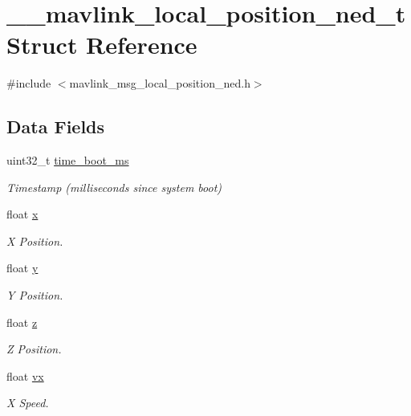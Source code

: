 \hypertarget{struct____mavlink__local__position__ned__t}{\section{\+\_\+\+\_\+mavlink\+\_\+local\+\_\+position\+\_\+ned\+\_\+t Struct Reference}
\label{struct____mavlink__local__position__ned__t}
}


{\ttfamily \#include $<$mavlink\+\_\+msg\+\_\+local\+\_\+position\+\_\+ned.\+h$>$}

\subsection*{Data Fields}
\begin{DoxyCompactItemize}
\item 
uint32\+\_\+t \hyperlink{struct____mavlink__local__position__ned__t_a00187442905b1327719d9fde885a9bf9}{time\+\_\+boot\+\_\+ms}
\begin{DoxyCompactList}\small\item\em Timestamp (milliseconds since system boot) \end{DoxyCompactList}\item 
float \hyperlink{struct____mavlink__local__position__ned__t_ab8f239110cba8ccc0f92aab56bc9a1d3}{x}
\begin{DoxyCompactList}\small\item\em X Position. \end{DoxyCompactList}\item 
float \hyperlink{struct____mavlink__local__position__ned__t_a56754cbe34638a9f6b5adca9ecf7fb44}{y}
\begin{DoxyCompactList}\small\item\em Y Position. \end{DoxyCompactList}\item 
float \hyperlink{struct____mavlink__local__position__ned__t_a4fc3fd6b6974b6b2356e4a7e28f9fecd}{z}
\begin{DoxyCompactList}\small\item\em Z Position. \end{DoxyCompactList}\item 
float \hyperlink{struct____mavlink__local__position__ned__t_a87216fec6527221da8812d77d8d84eb1}{vx}
\begin{DoxyCompactList}\small\item\em X Speed. \end{DoxyCompactList}\item 

\end{DoxyCompactItemize}
